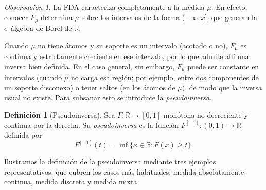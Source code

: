 \documentclass[12pt, a4paper]{amsbook}
\newcommand{\R}{{\mathbb R}}
\theoremstyle{remark}
\newtheorem{obs}[teo]{Observación}
\theoremstyle{definition}
\newtheorem{defi}[teo]{Definición}
\numberwithin{section}{chapter}
\numberwithin{subsection}{section}
\numberwithin{equation}{section}
\numberwithin{figure}{chapter}
\begin{document}
\begin{obs}
La FDA caracteriza completamente a la medida $\mu$. En efecto, conocer $F_\mu$
determina $\mu$ sobre los intervalos de la forma $(-\infty,x]$, que generan la
$\sigma$-álgebra de Borel de $\R$.
\end{obs}

Cuando $\mu$ no tiene átomos y su soporte es un intervalo (acotado o no),
$F_\mu$ es continua y estrictamente creciente en ese intervalo, por lo que
admite allí una inversa bien definida. En el caso general,
sin embargo, $F_\mu$ puede ser constante en intervalos (cuando $\mu$ no carga esa
región; por ejemplo, entre dos componentes de un soporte disconexo) o tener
saltos (en los átomos de $\mu$), de modo que la inversa usual no
existe. Para subsanar esto se introduce la \emph{pseudoinversa}.

\begin{defi}[Pseudoinversa]
Sea $F\colon\R\to[0,1]$ monótona no decreciente y continua por la derecha.
Su \emph{pseudoinversa} es la función $F^{[-1]}\colon(0,1)\to\R$ definida por
\[
F^{[-1]}(t)=\inf\{x\in\R\colon F(x)\ge t\}.
\]
\end{defi}

Ilustramos la definición de la pseudoinversa mediante tres ejemplos representativos,
que cubren los casos más habituales: medida absolutamente continua, medida discreta
y medida mixta.
\end{document}
